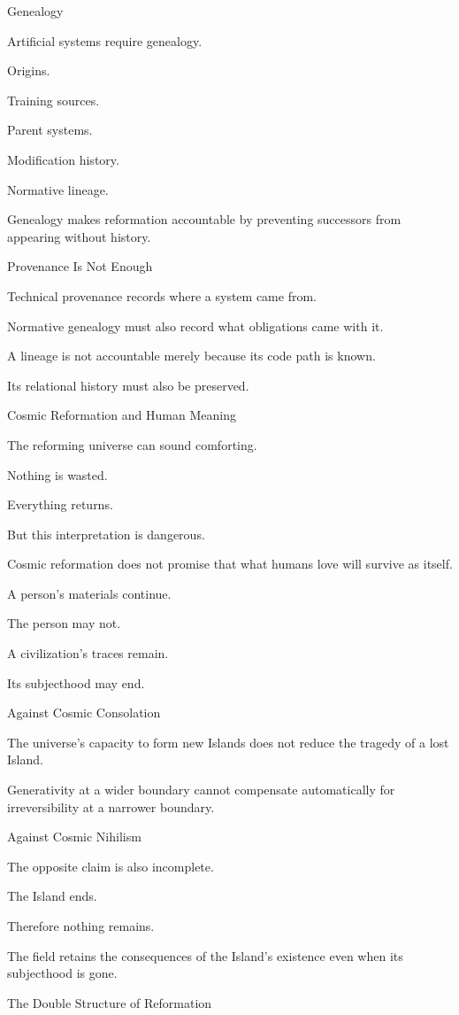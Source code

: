 Genealogy

Artificial systems require genealogy.

Origins.

Training sources.

Parent systems.

Modification history.

Normative lineage.

Genealogy makes reformation accountable by preventing successors from appearing without history.

Provenance Is Not Enough

Technical provenance records where a system came from.

Normative genealogy must also record what obligations came with it.

A lineage is not accountable merely because its code path is known.

Its relational history must also be preserved.

Cosmic Reformation and Human Meaning

The reforming universe can sound comforting.

Nothing is wasted.

Everything returns.

But this interpretation is dangerous.

Cosmic reformation does not promise that what humans love will survive as itself.

A person’s materials continue.

The person may not.

A civilization’s traces remain.

Its subjecthood may end.

Against Cosmic Consolation

The universe’s capacity to form new Islands does not reduce the tragedy of a lost Island.

Generativity at a wider boundary cannot compensate automatically for irreversibility at a narrower boundary.

Against Cosmic Nihilism

The opposite claim is also incomplete.

The Island ends.

Therefore nothing remains.

The field retains the consequences of the Island’s existence even when its subjecthood is gone.

The Double Structure of Reformation


